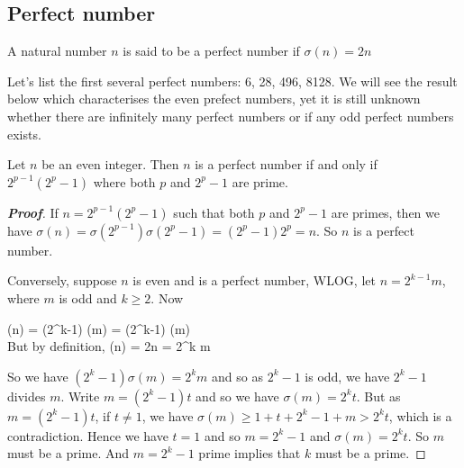 \subsection{Perfect number}
\begin{definition} A natural number $n$ is said to be a perfect number if $\sigma(n)=2n$
\end{definition}
Let's list the first several perfect numbers: 6, 28, 496, 8128. We will see the result below which characterises the even prefect numbers, yet it is still unknown whether there are infinitely many perfect numbers or if any odd perfect numbers exists.
\begin{lemma} Let $n$ be an even integer. Then $n$ is a perfect number if and only if $2^{p-1}(2^p-1)$ where both $p$ and $2^p -1$ are prime.
\end{lemma}
\begin{proof}[\bf Proof] If $n = 2^{p-1}(2^p-1)$ such that both $p$ and $2^p-1$ are primes, then we have $\sigma(n)=\sigma(2^{p-1}) \sigma(2^p-1) = (2^p -1)2^p = n$. So $n$ is a perfect number.

Conversely, suppose $n$ is even and is a perfect number, WLOG, let $n=2^{k-1}m$, where $m$ is odd and $k \ge 2$. Now

\be
\sigma(n) = \sigma(2^{k-1}) \sigma(m) =   (2^k-1) \sigma(m)\\
\ee
But by definition,
\be
\sigma(n) = 2n = 2^k m
\ee

So we have $(2^k - 1) \sigma(m) =2^k m$ and so as $2^k-1$ is odd, we have $2^k-1$ divides $m$. Write $m = (2^k-1)t$ and so we have $\sigma(m)=2^k t$. But as $m = (2^k-1)t$, if $t \neq 1$, we have $\sigma(m) \ge 1 + t + 2^k -1 + m > 2^k t$, which is a contradiction. Hence we have $t = 1$ and so $m = 2^k -1$ and $\sigma(m)=2^k t$. So $m$ must be a prime. And $m=2^k-1$ prime implies that $k$ must be a prime.
\end{proof}
